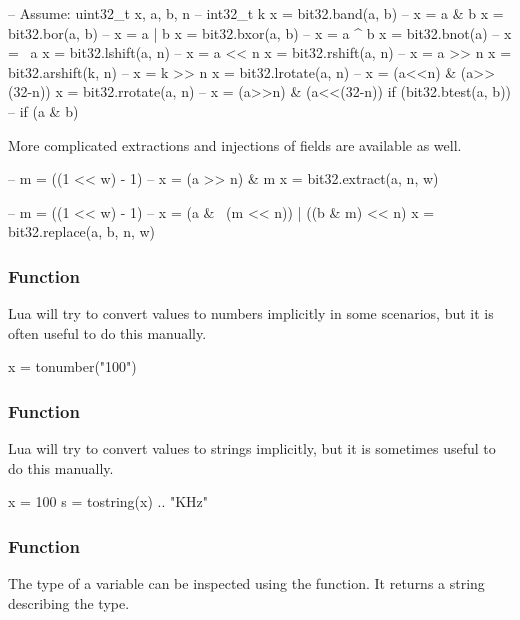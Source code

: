 \begin{LuaCode}
-- Assume: uint32_t x, a, b, n
--         int32_t k
x = bit32.band(a, b)    -- x = a & b
x = bit32.bor(a, b)     -- x = a | b
x = bit32.bxor(a, b)    -- x = a ^ b
x = bit32.bnot(a)       -- x = ~a
x = bit32.lshift(a, n)  -- x = a << n
x = bit32.rshift(a, n)  -- x = a >> n
x = bit32.arshift(k, n) -- x = k >> n
x = bit32.lrotate(a, n) -- x = (a<<n) & (a>>(32-n))
x = bit32.rrotate(a, n) -- x = (a>>n) & (a<<(32-n))
if (bit32.btest(a, b))  -- if (a & b)
\end{LuaCode}

More complicated extractions and injections of fields are available as well.

\begin{LuaCode}
-- m = ((1 << w) - 1)
-- x = (a >> n) & m
x = bit32.extract(a, n, w)
\end{LuaCode}

\begin{LuaCode}
-- m = ((1 << w) - 1)
-- x = (a & ~(m << n)) | ((b & m) << n)
x = bit32.replace(a, b, n, w)
\end{LuaCode}

\subsubsection{ Function}

Lua will try to convert values to numbers implicitly in some scenarios, but it
is often useful to do this manually.

\begin{LuaCode}
x = tonumber("100")
\end{LuaCode}

\subsubsection{ Function}

Lua will try to convert values to strings implicitly, but it is sometimes
useful to do this manually.

\begin{LuaCode}
x = 100
s = tostring(x) .. "KHz"
\end{LuaCode}

\subsubsection{ Function}

The type of a variable can be inspected using the  function.  It
returns a string describing the type.


